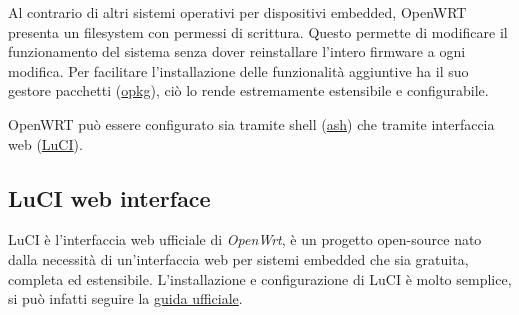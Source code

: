 Al contrario di altri sistemi operativi per dispositivi embedded, OpenWRT presenta un filesystem con permessi di scrittura. Questo permette di modificare il funzionamento del sistema senza dover reinstallare l'intero firmware a ogni modifica. Per facilitare l'installazione delle funzionalità aggiuntive ha il suo gestore pacchetti (\href{https://openwrt.org/docs/guide-user/additional-software/opkg}{opkg}), ciò lo rende estremamente estensibile e configurabile.

OpenWRT può essere configurato sia tramite shell (\href{https://en.wikipedia.org/wiki/Almquist_shell}{ash}) che tramite interfaccia web (\href{https://openwrt.org/docs/guide-user/luci/start}{LuCI}).


\subsection{LuCI web interface \ok}
\label{subsec:luci-web-interface}

LuCI è l'interfaccia web ufficiale di \textit{OpenWrt}, è un progetto open-source nato dalla necessità di un'interfaccia web per sistemi embedded che sia gratuita, completa ed estensibile. L'installazione e configurazione di LuCI è molto semplice, si può infatti seguire la \href{https://openwrt.org/docs/guide-user/luci/luci.essentials}{guida ufficiale}.


